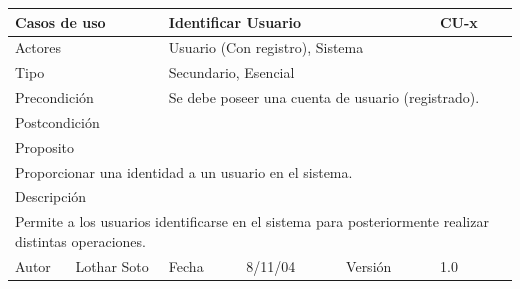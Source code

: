 \documentclass{article}
\begin{document}
\begin{table}[h]
\begin{tabular}{|l|l|l|l|l|l|}
\hline
\multicolumn{2}{|p{2cm}|}{Casos de uso}  & \multicolumn{3}{p{7cm}|}{Identificar Usuario} & CU-x \\
\hline
\multicolumn{2}{|p{2cm}|}{Actores}       & \multicolumn{4}{p{8cm}|}{Usuario (Con registro), Sistema}        \\
\hline
\multicolumn{2}{|p{2cm}|}{Tipo}          & \multicolumn{4}{p{8cm}|}{Secundario, Esencial}        \\
\hline
\multicolumn{2}{|p{2cm}|}{Precondición}  & \multicolumn{4}{p{8cm}|}{Se debe poseer una cuenta de usuario (registrado).}        \\
\hline
\multicolumn{2}{|p{2cm}|}{Postcondición} & \multicolumn{4}{p{8cm}|}{}        \\
\hline
\multicolumn{6}{|p{10cm}|}{Proposito}                                   \\
\hline
\multicolumn{6}{|p{10cm}|}{Proporcionar una identidad a un usuario en el sistema.}                                            \\
\hline
\multicolumn{6}{|p{10cm}|}{Descripción}                                 \\
\hline
\multicolumn{6}{|p{10cm}|}{Permite a los usuarios identificarse en el sistema para posteriormente realizar distintas operaciones.}                                            \\
\hline
Autor          &       Lothar Soto        & Fecha    &  8/11/04   &   Versión  & 1.0\\    
\hline
\end{tabular}
\end{table}
\end{document}
